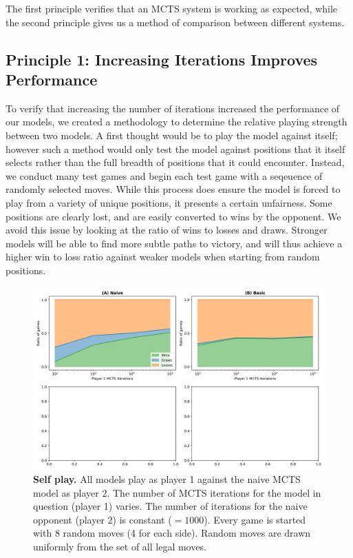\documentclass[10pt]{article}
\begin{document}
The first principle verifies that an MCTS system is working as expected, while the second principle gives us a method of comparison between different systems.

\subsection{Principle 1: Increasing Iterations Improves Performance}

To verify that increasing the number of iterations increased the performance of our models, we created a methodology to determine the relative playing strength between two models. A first thought would be to play the model against itself; however such a method would only test the model against positions that it itself selects rather than the full breadth of positions that it could encounter. Instead, we conduct many test games and begin each test game with a seqeuence of randomly selected moves. While this process does ensure the model is forced to play from a variety of unique positions, it presents a certain unfairness. Some positions are clearly lost, and are easily converted to wins by the opponent. We avoid this issue by looking at the ratio of wins to losses and draws. Stronger models will be able to find more subtle paths to victory, and will thus achieve a higher win to loss ratio against weaker models when starting from random positions.

\begin{figure}[H]
    \centering
    \includegraphics[width=\linewidth]{win_rates.png}
    \caption{\textbf{Self play.} All models play as player 1 against the naive MCTS model as player 2. The number of MCTS iterations for the model in question (player 1) varies. The number of iterations for the naive opponent (player 2) is constant ($= 1000$). Every game is started with 8 random moves (4 for each side). Random moves are drawn uniformly from the set of all legal moves.}
    \label{fig:selfplay}
\end{figure}
\end{document}
